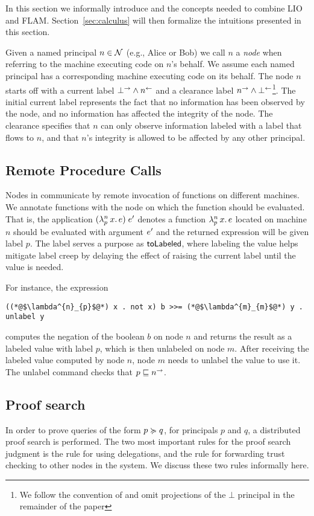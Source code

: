 In this section we informally introduce \lang{} and the concepts needed to combine LIO and FLAM. Section~\ref{sec:calculus} will then formalize the intuitions presented in this section.

Given a named principal $n \in \mathcal{N}$ (e.g., Alice or Bob) we call $n$ a \emph{node} when referring to the machine executing code on $n$'s behalf. We assume each named principal has a corresponding machine executing code on its behalf. The node $n$ starts off with a current label $\bot^{\rightarrow} \wedge n^{\leftarrow}$ and a clearance label $n^{\rightarrow} \wedge \bot^{\leftarrow}$\footnote{We follow the convention of \cite{Arden:2015:FA:2859845.2859998} and omit projections of the $\bot$ principal in the remainder of the paper}. The initial current label represents the fact that no information has been observed by the node, and no information has affected the integrity of the node. The clearance specifies that $n$ can only observe information labeled with a label that flows to $n$, and that $n$'s integrity is allowed to be affected by any other principal.

\subsection{Remote Procedure Calls}
Nodes in \lang{} communicate by remote invocation of functions on different machines. We annotate functions with the node on which the function should be evaluated. That is, the application $(\lambda^{n}_{p}\,x.\,e)\;e'$ denotes a function $\lambda^{n}_{p}\,x.\,e$ located on machine $n$ should be evaluated with argument $e'$ and the returned expression will be given label $p$. The label serves a purpose as $\mathsf{toLabeled}$, where labeling the value helps mitigate label creep by delaying the effect of raising the current label until the value is needed.

For instance, the expression
\begin{lstlisting}
((*@$\lambda^{n}_{p}$@*) x . not x) b >>= (*@$\lambda^{m}_{m}$@*) y . unlabel y
\end{lstlisting}
computes the negation of the boolean $b$ on node $n$ and returns the result as a labeled value with label $p$, which is then unlabeled on node $m$. After receiving the labeled value computed by node $n$, node $m$ needs to unlabel the value to use it. The unlabel command checks that $p \sqsubseteq n^{\rightarrow}$.

\subsection{Proof search}
In order to prove queries of the form $p \succcurlyeq q$, for principals $p$ and $q$, a distributed proof search is performed. The two most important rules for the proof search judgment is the rule for using delegations, and the rule for forwarding trust checking to other nodes in the system. We discuss these two rules informally here.

